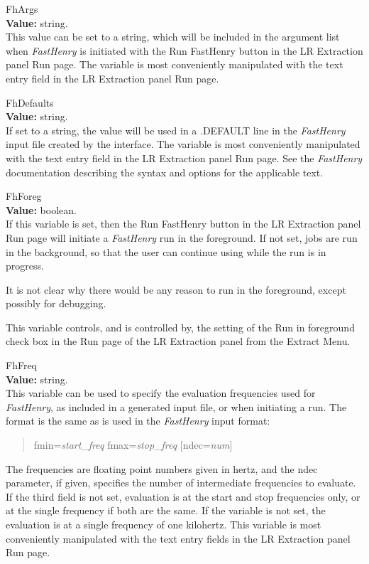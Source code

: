 \begin{description}
\item{\et FhArgs}\\
{\bf Value:} string.\\
This value can be set to a string, which will be included in the
argument list when {\it FastHenry} is initiated with the {\cb Run
FastHenry} button in the {\cb LR Extraction} panel {\cb Run}
page.  The variable is most conveniently manipulated with the text
entry field in the {\cb LR Extraction} panel {\cb Run} page.

\item{\et FhDefaults}\\
{\bf Value:} string.\\
If set to a string, the value will be used in a {\vt .DEFAULT} line in
the {\it FastHenry} input file created by the interface.  The variable
is most conveniently manipulated with the text entry field in the {\cb
LR Extraction} panel {\cb Run} page.  See the {\it FastHenry}
documentation describing the syntax and options for the applicable
text.

\item{\et FhForeg}\\
{\bf Value:} boolean.\\
If this variable is set, then the {\cb Run FastHenry} button in the
{\cb LR Extraction} panel {\cb Run} page will initiate a {\it
FastHenry} run in the foreground.  If not set, jobs are run in the
background, so that the user can continue using {\Xic} while the run
is in progress.

It is not clear why there would be any reason to run in the
foreground, except possibly for debugging.

This variable controls, and is controlled by, the setting of the {\cb
Run in foreground} check box in the {\cb Run} page of the {\cb LR
Extraction} panel from the {\cb Extract Menu}.

\item{\et FhFreq}\\
{\bf Value:} string.\\
This variable can be used to specify the evaluation frequencies used
for {\it FastHenry}, as included in a generated input file, or when
initiating a run.  The format is the same as is used in the {\it
FastHenry} input format:
\begin{quote}
{\vt fmin=}{\it start\_freq} {\vt fmax=}{\it stop\_freq}
     [{\vt ndec=}{\it num\/}]
\end{quote}
The frequencies are floating point numbers given in hertz, and the
{\vt ndec} parameter, if given, specifies the number of intermediate
frequencies to evaluate.  If the third field is not set, evaluation is
at the start and stop frequencies only, or at the single frequency if
both are the same.  If the variable is not set, the evaluation is at a
single frequency of one kilohertz.  This variable is most conveniently
manipulated with the text entry fields in the {\cb LR Extraction}
panel {\cb Run} page.


\end{description}
